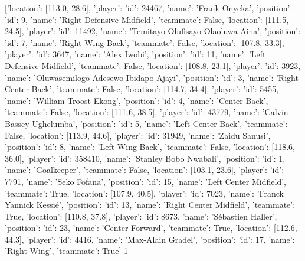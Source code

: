 [{'location': [113.0, 28.6], 'player': {'id': 24467, 'name': 'Frank Onyeka'}, 'position': {'id': 9, 'name': 'Right Defensive Midfield'}, 'teammate': False}, {'location': [111.5, 24.5], 'player': {'id': 11492, 'name': 'Temitayo Olufisayo Olaoluwa Aina'}, 'position': {'id': 7, 'name': 'Right Wing Back'}, 'teammate': False}, {'location': [107.8, 33.3], 'player': {'id': 3647, 'name': 'Alex Iwobi'}, 'position': {'id': 11, 'name': 'Left Defensive Midfield'}, 'teammate': False}, {'location': [108.8, 23.1], 'player': {'id': 3923, 'name': 'Oluwasemilogo Adesewo Ibidapo Ajayi'}, 'position': {'id': 3, 'name': 'Right Center Back'}, 'teammate': False}, {'location': [114.7, 34.4], 'player': {'id': 5455, 'name': 'William Troost-Ekong'}, 'position': {'id': 4, 'name': 'Center Back'}, 'teammate': False}, {'location': [111.6, 38.5], 'player': {'id': 43779, 'name': 'Calvin Bassey Ughelumba'}, 'position': {'id': 5, 'name': 'Left Center Back'}, 'teammate': False}, {'location': [113.9, 44.6], 'player': {'id': 31949, 'name': 'Zaidu Sanusi'}, 'position': {'id': 8, 'name': 'Left Wing Back'}, 'teammate': False}, {'location': [118.6, 36.0], 'player': {'id': 358410, 'name': 'Stanley Bobo Nwabali'}, 'position': {'id': 1, 'name': 'Goalkeeper'}, 'teammate': False}, {'location': [103.1, 23.6], 'player': {'id': 7791, 'name': 'Seko Fofana'}, 'position': {'id': 15, 'name': 'Left Center Midfield'}, 'teammate': True}, {'location': [107.9, 40.5], 'player': {'id': 7023, 'name': 'Franck Yannick Kessié'}, 'position': {'id': 13, 'name': 'Right Center Midfield'}, 'teammate': True}, {'location': [110.8, 37.8], 'player': {'id': 8673, 'name': 'Sébastien Haller'}, 'position': {'id': 23, 'name': 'Center Forward'}, 'teammate': True}, {'location': [112.6, 44.3], 'player': {'id': 4416, 'name': 'Max-Alain Gradel'}, 'position': {'id': 17, 'name': 'Right Wing'}, 'teammate': True}]                                                                                                                                                                                                                                                                                                                                                                                                                                                                                                                                                                                                                                                                                                                                                                                                                                                                                                                                                                                                                                                                                                  1
